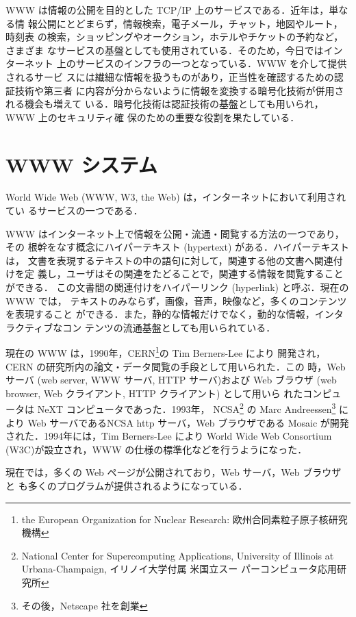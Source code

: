 WWW は情報の公開を目的とした TCP/IP 上のサービスである．近年は，単なる情
報公開にとどまらず，情報検索，電子メール，チャット，地図やルート，時刻表
の検索，ショッピングやオークション，ホテルやチケットの予約など，さまざま
なサービスの基盤としても使用されている．そのため，今日ではインターネット
上のサービスのインフラの一つとなっている．WWW を介して提供されるサービ
スには繊細な情報を扱うものがあり，正当性を確認するための認証技術や第三者
に内容が分からないように情報を変換する暗号化技術が併用される機会も増えて
いる．暗号化技術は認証技術の基盤としても用いられ，WWW 上のセキュリティ確
保のための重要な役割を果たしている．

\section{WWW システム}
World Wide Web (WWW, W3, the Web) は，インターネットにおいて利用されてい
るサービスの一つである．

WWW はインターネット上で情報を公開・流通・閲覧する方法の一つであり，その
根幹をなす概念にハイパーテキスト (hypertext) がある．ハイパーテキストは，
文書を表現するテキストの中の語句に対して，関連する他の文書へ関連付けを定
義し，ユーザはその関連をたどることで，関連する情報を閲覧することができる．
この文書間の関連付けをハイパーリンク (hyperlink) と呼ぶ．現在の WWW では，
テキストのみならず，画像，音声，映像など，多くのコンテンツを表現すること
ができる．また，静的な情報だけでなく，動的な情報，インタラクティブなコン
テンツの流通基盤としても用いられている．

現在の WWW は，1990年，CERN\footnote{the European Organization for
Nuclear Research: 欧州合同素粒子原子核研究機構}の Tim Berners-Lee により
開発され，CERN の研究所内の論文・データ閲覧の手段として用いられた．この
時，Web サーバ (web server, WWW サーバ, HTTP サーバ)および Web ブラウザ
(web browser, Web クライアント, HTTP クライアント) として用いら
れたコンピュータは NeXT コンピュータであった．1993年，
NCSA\footnote{National Center for Supercomputing Applications,
University of Illinois at Urbana-Champaign, イリノイ大学付属 米国立スー
パーコンピュータ応用研究所} の Marc Andreessen\footnote{その後，Netscape 
社を創業} により Web サーバであるNCSA http サーバ，Web ブラウザである 
Mosaic が開発された．1994年には，Tim Berners-Lee により World Wide Web
Consortium (W3C)が設立され，WWW の仕様の標準化などを行うようになった．

現在では，多くの Web ページが公開されており，Web サーバ，Web ブラウザと
も多くのプログラムが提供されるようになっている．

